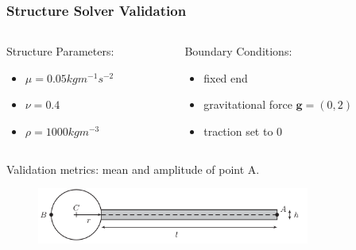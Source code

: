 \documentclass{beamer}
\begin{document}
\begin{frame}
\frametitle{Structure Solver Validation}

\begin{columns}
\begin{column}{0.5\textwidth}

Structure Parameters: 
\begin{itemize}
\item $\mu = 0.05 kgm^{-1} s^{-2}$
\item $\nu = 0.4$
\item $\rho = 1000 kgm^{-3}$ %
\end{itemize}

\end{column}
\begin{column}{0.5\textwidth}

Boundary Conditions:
\begin{itemize}
\item fixed end
\item gravitational force $ \textbf{g} = (0, 2)$ 
\item traction set to 0
\end{itemize}

\end{column}
\end{columns}

\vspace{0.5cm}
Validation metrics: mean and amplitude of point A. 

\begin{figure}[h]
\centering
	\includegraphics[width=0.8\textwidth]{struct_geom}
	\label{fig:structGeom}
\end{figure}

\end{frame}

\end{document}
